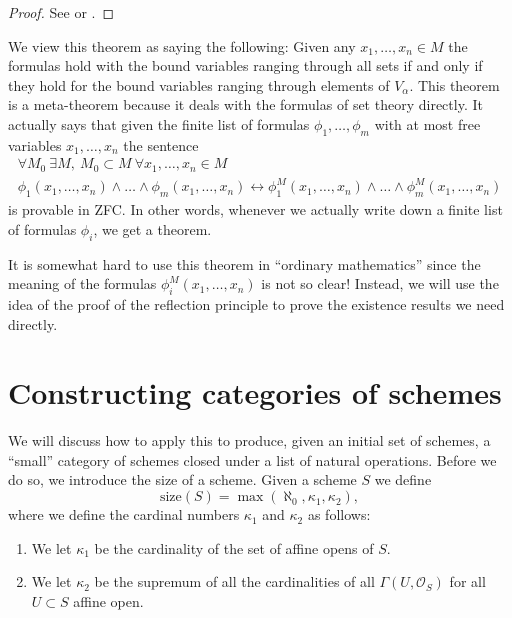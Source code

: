 \begin{proof}
See \cite[Theorem 12.14]{Jech} or \cite[Theorem 7.4]{Kunen}.
\end{proof}

\noindent
We view this theorem as saying the following: Given any
$x_1, \ldots, x_n \in M$ the formulas hold with the bound variables ranging
through all sets if and only if they hold for the bound variables ranging
through elements of $V_\alpha$. This theorem is a meta-theorem because
it deals with the formulas of set theory directly.
It actually says that given the finite list of formulas
$\phi_1, \ldots, \phi_m$ with at most free variables $x_1, \ldots, x_n$
the sentence
$$
\begin{matrix}
\forall M_0\ \exists M, \ M_0 \subset M\ \forall x_1, \ldots, x_n \in M \\
\phi_1(x_1, \ldots, x_n) \wedge \ldots \wedge \phi_m(x_1, \ldots, x_n)
\leftrightarrow
\phi_1^M(x_1, \ldots, x_n) \wedge \ldots \wedge \phi_m^M(x_1, \ldots, x_n)
\end{matrix}
$$
is provable in ZFC. In other words, whenever we actually write down
a finite list of formulas $\phi_i$, we get a theorem.

\medskip\noindent
It is somewhat hard to use this theorem in ``ordinary mathematics''
since the meaning of the formulas $\phi_i^M(x_1, \ldots, x_n)$
is not so clear! Instead, we will use the idea of the proof of the
reflection principle to prove the existence results we need directly.

\section{Constructing categories of schemes}
\label{section-categories-schemes}

\noindent
We will discuss how to apply this to produce, given an initial
set of schemes, a ``small'' category of schemes closed under
a list of natural operations. Before we do so, we introduce the
size of a scheme. Given a scheme $S$ we define
$$
\text{size}(S) = \max(\aleph_0, \kappa_1, \kappa_2),
$$
where we define the cardinal numbers $\kappa_1$ and $\kappa_2$ as follows:
\begin{enumerate}
\item We let $\kappa_1$ be the cardinality of the set of affine opens of $S$.
\item We let $\kappa_2$ be the supremum of all the cardinalities of
all $\Gamma(U, \mathcal{O}_S)$ for all $U \subset S$ affine open.
\end{enumerate}

